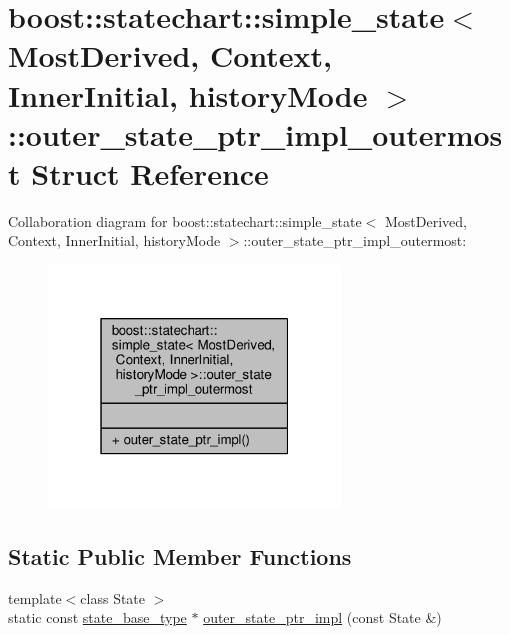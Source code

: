 \hypertarget{structboost_1_1statechart_1_1simple__state_1_1outer__state__ptr__impl__outermost}{}\section{boost\+:\+:statechart\+:\+:simple\+\_\+state$<$ Most\+Derived, Context, Inner\+Initial, history\+Mode $>$\+:\+:outer\+\_\+state\+\_\+ptr\+\_\+impl\+\_\+outermost Struct Reference}
\label{structboost_1_1statechart_1_1simple__state_1_1outer__state__ptr__impl__outermost}


Collaboration diagram for boost\+:\+:statechart\+:\+:simple\+\_\+state$<$ Most\+Derived, Context, Inner\+Initial, history\+Mode $>$\+:\+:outer\+\_\+state\+\_\+ptr\+\_\+impl\+\_\+outermost\+:
\nopagebreak
\begin{figure}[H]
\begin{center}
\leavevmode
\includegraphics[width=220pt]{structboost_1_1statechart_1_1simple__state_1_1outer__state__ptr__impl__outermost__coll__graph}
\end{center}
\end{figure}
\subsection*{Static Public Member Functions}
\begin{DoxyCompactItemize}
\item 
{\footnotesize template$<$class State $>$ }\\static const \mbox{\hyperlink{classboost_1_1statechart_1_1simple__state_ae4af81f8eae996cc418efa3387af0ef6}{state\+\_\+base\+\_\+type}} $\ast$ \mbox{\hyperlink{structboost_1_1statechart_1_1simple__state_1_1outer__state__ptr__impl__outermost_a82c1160b2f758246aa1157850fdc54fb}{outer\+\_\+state\+\_\+ptr\+\_\+impl}} (const State \&)
\end{DoxyCompactItemize}


